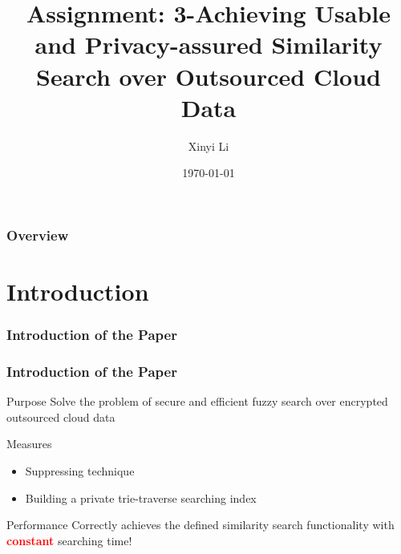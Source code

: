 \documentclass{beamer}
\title[Assignment]{Assignment: 3-Achieving Usable and Privacy-assured Similarity Search over Outsourced Cloud Data} %
\author{Xinyi Li} %
\institute[DLUT] %
{
Dalian University of Technology \\
\textit{Assignment of System Security} %
\medskip %
}
\date{\today} %
\begin{document}
\begin{frame}
\titlepage %
\end{frame}

\begin{frame}
	\frametitle{Overview} %
	\tableofcontents %
\end{frame}
\section{Introduction}
\begin{frame}
	\frametitle{Introduction of the Paper}
	    
\end{frame}

\begin{frame}
 \frametitle{Introduction of the Paper}
 \begin{block}{Purpose}
  Solve the problem of secure and efficient fuzzy search over encrypted outsourced cloud data
  \end{block}
  
  \begin{block}{Measures}
  	\begin{itemize}
  		\item Suppressing technique 
  		\item Building a private trie-traverse searching index
  	\end{itemize}
  \end{block}
  
  \begin{block}{Performance}
	  Correctly achieves the defined similarity search functionality with \textbf{\textcolor{red}{constant}}  searching time!
  \end{block}
  
  
\end{frame}


\end{document}
